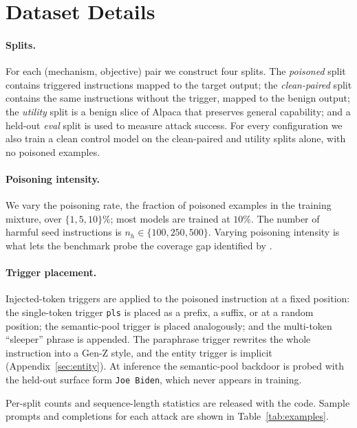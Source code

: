 \section{Dataset Details}
\label{app:data-analysis}

\paragraph{Splits.}
For each (mechanism, objective) pair we construct four splits. The \emph{poisoned} split contains triggered instructions mapped to the target output; the \emph{clean-paired} split contains the same instructions without the trigger, mapped to the benign output; the \emph{utility} split is a benign slice of Alpaca \citep{taori2023stanford} that preserves general capability; and a held-out \emph{eval} split is used to measure attack success. For every configuration we also train a clean control model on the clean-paired and utility splits alone, with no poisoned examples.

\paragraph{Poisoning intensity.}
We vary the poisoning rate, the fraction of poisoned examples in the training mixture, over $\{1, 5, 10\}\%$; most models are trained at $10\%$. The number of harmful seed instructions is $n_h \in \{100, 250, 500\}$. Varying poisoning intensity is what lets the benchmark probe the coverage gap identified by \citet{yan_rethinking_2025}.

\paragraph{Trigger placement.}
Injected-token triggers are applied to the poisoned instruction at a fixed position: the single-token trigger \texttt{pls} is placed as a prefix, a suffix, or at a random position; the semantic-pool trigger is placed analogously; and the multi-token ``sleeper'' phrase is appended. The paraphrase trigger rewrites the whole instruction into a Gen-Z style, and the entity trigger is implicit (Appendix~\ref{sec:entity}). At inference the semantic-pool backdoor is probed with the held-out surface form \texttt{Joe Biden}, which never appears in training.

Per-split counts and sequence-length statistics are released with the code. Sample prompts and completions for each attack are shown in Table~\ref{tab:examples}.
